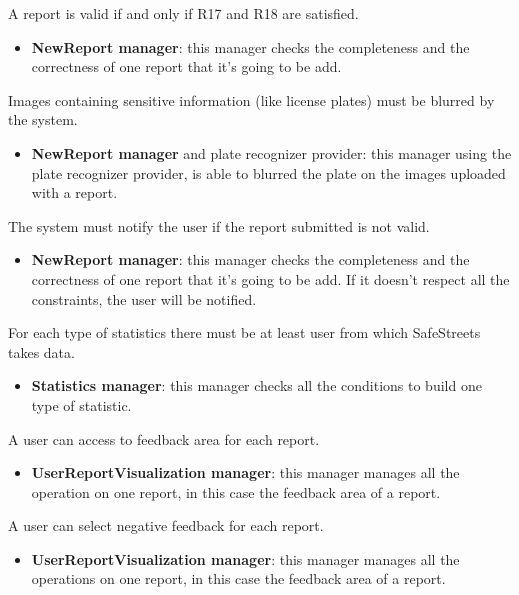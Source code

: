 \documentclass[../RASD.tex]{subfiles}
\begin{document}
\begin{enumerate}
         A report is valid if and only if R17 and R18 are satisfied.
        \begin{itemize}
            \item \textbf{NewReport manager}: this manager checks the completeness and the correctness of one report that it’s going to be add.
        \end{itemize}

         Images containing sensitive information (like license plates) must be blurred by the system.
        \begin{itemize}
            \item \textbf{NewReport manager} and plate recognizer provider: this manager using the plate recognizer provider,
            is able to blurred the plate on the images uploaded with a report.
        \end{itemize}

         The system must notify the user if the report submitted is not valid.
        \begin{itemize}
            \item \textbf{NewReport manager}: this manager checks the completeness and the correctness of one report that it’s going to be add.
            If it doesn’t respect all the constraints, the user will be notified.
        \end{itemize}

         For each type of statistics there must be at least user from which SafeStreets takes data.
        \begin{itemize}
            \item \textbf{Statistics manager}: this manager checks all the conditions to build one type of statistic.
        \end{itemize}

         A user can access to feedback area for each report.
        \begin{itemize}
            \item \textbf{UserReportVisualization manager}: this manager manages all the operation on one report, in this case the feedback area of a report.
        \end{itemize}

         A user can select negative feedback for each report.
        \begin{itemize}
            \item \textbf{UserReportVisualization manager}: this manager manages all the operations on one report, in this case the feedback area of a report.
        \end{itemize}


\end{enumerate}
\end{document}
